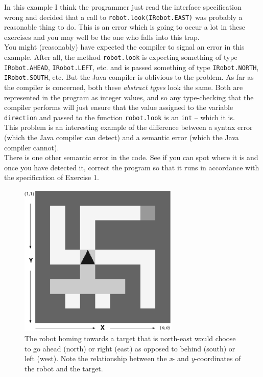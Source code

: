 \noindent
In this example I think the programmer just read the interface 
specification wrong and decided that a call to 
{\tt robot.look(IRobot.EAST)} was probably a reasonable thing to do. This is
an error which is going to occur a lot in these exercises and you may well 
be the one who falls into this trap. \\ 

\noindent
You might (reasonably) have expected the compiler to signal an error in this 
example. After all, the method {\tt robot.look} is expecting something of type 
{\tt IRobot.AHEAD}, {\tt IRobot.LEFT}, etc. 
and is passed something of type {\tt IRobot.NORTH}, {\tt IRobot.SOUTH}, etc. 
But the Java compiler is oblivious to the problem. As far as the compiler is 
concerned, both these {\it abstract types} look the same. Both are represented
in the program as integer values, and so any type-checking that the 
compiler performs will just ensure that the value assigned to the variable 
{\tt direction} and passed to the function {\tt robot.look} is an {\tt int} --
which it is. \\

\noindent
This problem is an 
interesting example of the difference between a syntax error (which the 
Java compiler can detect) and a semantic error (which the Java compiler cannot). \\

\noindent
There is one other semantic error in the code. See if you can spot where it is
and once you have detected it, correct the program so that it runs 
in accordance with the specification of Exercise 1. \\


\begin{figure}[ht]
\centering
\includegraphics[width=3in]{pigs3.pdf}
\caption{The robot homing towards a target that is north-east would choose to 
go ahead (north) or right (east) as opposed to behind (south) or left (west). 
Note the relationship between the {\em x}- and {\em y}-coordinates of the robot 
and the target.
\label{northcontroller}}
\end{figure}    

